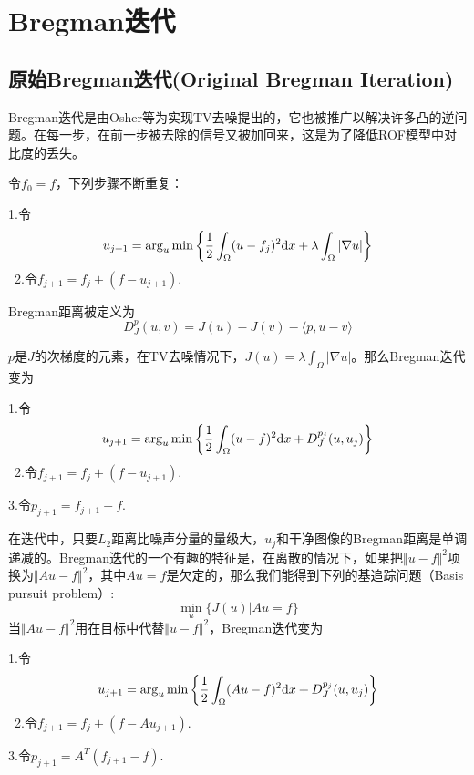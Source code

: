 \documentclass[a4paper,12pt]{article}
\begin{document}
\section{Bregman迭代}

\subsection{原始Bregman迭代(Original Bregman Iteration)}

Bregman迭代是由Osher等\cite{Osher:2005br}为实现TV去噪提出的，它也被推广以解决许多凸的逆问题。在每一步，在前一步被去除的信号又被加回来，这是为了降低ROF模型中对比度的丢失。

令$f_0=f$，下列步骤不断重复：

1.令
\begin{displaymath}
u_{j+1}=\arg_u\min\bigg{\{}\frac{1}{2}\int_{\Omega}(u-f_j)^2\mathrm{d} x+\lambda\int_{\Omega}|\nabla u|\bigg{\}}
\end{displaymath}
\quad\ 2.令$f_{j+1}=f_j+(f-u_{j+1})$.

Bregman距离被定义为
\begin{displaymath}
D_J^p(u,v)=J(u)-J(v)-\langle p,u-v\rangle
\end{displaymath}

$p$是$J$的次梯度的元素，在TV去噪情况下，$J(u)=\lambda\int_{\Omega}|\nabla u|$。那么Bregman迭代变为

1.令
\begin{displaymath}
u_{j+1}=\arg_u\min\bigg{\{}\frac{1}{2}\int_{\Omega}(u-f)^2\mathrm{d} x+D_J^{p_j}(u,u_j)\bigg{\}}
\end{displaymath}
\quad\ 2.令$f_{j+1}=f_j+(f-u_{j+1})$.

 3.令$p_{j+1}=f_{j+1}-f$.

在迭代中，只要$L_2$距离比噪声分量的量级大，$u_j$和干净图像的Bregman距离是单调递减的。Bregman迭代的一个有趣的特征是，在离散的情况下，如果把$\Vert u-f\Vert^2$项换为$\Vert Au-f\Vert^2$，其中$Au=f$是欠定的，那么我们能得到下列的基追踪问题（Basis pursuit problem）:
\begin{displaymath}
\min_u\{J(u)|Au=f\}
\end{displaymath}
当$\Vert Au-f\Vert^2$用在目标中代替$\Vert u-f\Vert^2$，Bregman迭代变为

1.令
\begin{displaymath}
u_{j+1}=\arg_u\min\bigg{\{}\frac{1}{2}\int_{\Omega}(Au-f)^2\mathrm{d} x+D_J^{p_j}(u,u_j)\bigg{\}}
\end{displaymath}
\quad\ 2.令$f_{j+1}=f_j+(f-Au_{j+1})$.

 3.令$p_{j+1}=A^T(f_{j+1}-f)$.
\end{document}
